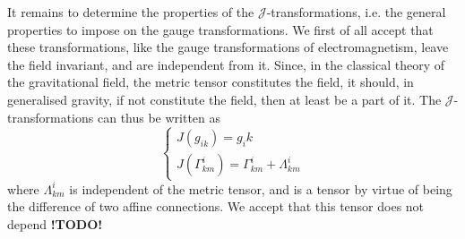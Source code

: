 \documentclass{article}
\newcommand{\JJ}{\mathcal{J}}
\newcommand{\todo}{\textbf{ !TODO! }}
\begin{document}
It remains to determine the properties of the $\JJ$-transformations, i.e. the general properties to impose on the gauge transformations.
We first of all accept that these transformations, like the gauge transformations of electromagnetism, leave the field invariant, and are independent from it.
Since, in the classical theory of the gravitational field, the metric tensor constitutes the field, it should, in generalised gravity, if not constitute the field, then at least be a part of it.
The $\JJ$-transformations can thus be written as
\[
\label{equation3}
  \begin{cases}
    J(g_{ik}) = g_ik
  \\J(\Gamma_{km}^i) = \Gamma_{km}^i+\Lambda_{km}^i
  \end{cases}
  \tag{3}
\]
where $\Lambda_{km}^i$ is independent of the metric tensor, and is a tensor by virtue of being the difference of two affine connections.
We accept that this tensor does not depend \todo
\end{document}
